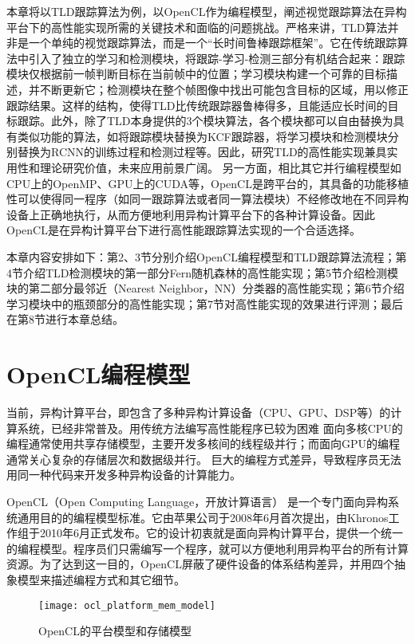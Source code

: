 本章将以TLD跟踪算法为例，以OpenCL作为编程模型，阐述视觉跟踪算法在异构平台下的高性能实现所需的关键技术和面临的问题挑战。严格来讲，TLD算法并非是一个单纯的视觉跟踪算法，而是一个``长时间鲁棒跟踪框架''。它在传统跟踪算法中引入了独立的学习和检测模块，将跟踪-学习-检测三部分有机结合起来：跟踪模块仅根据前一帧判断目标在当前帧中的位置；学习模块构建一个可靠的目标描述，并不断更新它；检测模块在整个帧图像中找出可能包含目标的区域，用以修正跟踪结果。这样的结构，使得TLD比传统跟踪器鲁棒得多，且能适应长时间的目标跟踪。此外，除了TLD本身提供的3个模块算法，各个模块都可以自由替换为具有类似功能的算法，如将跟踪模块替换为KCF跟踪器，将学习模块和检测模块分别替换为RCNN的训练过程和检测过程等。因此，研究TLD的高性能实现兼具实用性和理论研究价值，未来应用前景广阔。
另一方面，相比其它并行编程模型如CPU上的OpenMP、GPU上的CUDA等，OpenCL是跨平台的，其具备的功能移植性可以使得同一程序（如同一跟踪算法或者同一算法模块）不经修改地在不同异构设备上正确地执行，从而方便地利用异构计算平台下的各种计算设备。因此OpenCL是在异构计算平台下进行高性能跟踪算法实现的一个合适选择。

本章内容安排如下：第2、3节分别介绍OpenCL编程模型和TLD跟踪算法流程；第4节介绍TLD检测模块的第一部分\pozhehao Fern随机森林的高性能实现；第5节介绍检测模块的第二部分\pozhehao 最邻近（Nearest Neighbor，NN）分类器的高性能实现；第6节介绍学习模块中的瓶颈部分的高性能实现；第7节对高性能实现的效果进行评测；最后在第8节进行本章总结。

\section{OpenCL编程模型}
\label{oclmodels}
当前，异构计算平台，即包含了多种异构计算设备（CPU、GPU、DSP等）的计算系统，已经非常普及。用传统方法编写高性能程序已较为困难\pozhehao
面向多核CPU的编程通常使用共享存储模型，主要开发多核间的线程级并行；而面向GPU的编程通常关心复杂的存储层次和数据级并行。
巨大的编程方式差异，导致程序员无法用同一种代码来开发多种异构设备的计算能力。

OpenCL（Open Computing Language，开放计算语言） 是一个专门面向异构系统通用目的的编程模型标准。它由苹果公司于2008年6月首次提出，由Khronos工作组于2010年6月正式发布。它的设计初衷就是面向异构计算平台，提供一个统一的编程模型。程序员们只需编写一个程序，就可以方便地利用异构平台的所有计算资源。为了达到这一目的，OpenCL屏蔽了硬件设备的体系结构差异，并用四个抽象模型来描述编程方式和其它细节。

\begin{figure}[htb]
  \centering
  \texttt{[image: ocl\_platform\_mem\_model]}
  \caption{OpenCL的平台模型和存储模型}
  \label{oclplatformandmem}
\end{figure}

